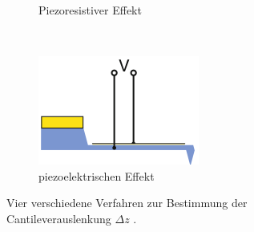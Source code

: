 \begin{figure}[H]
\begin{subfigure}[t]{0.22\textwidth}
  \caption{Piezoresistiver Effekt}
  \label{fig:typ3}
  \end{subfigure}
  ~
  \begin{subfigure}[t]{0.22\textwidth}
  \includegraphics[width=\textwidth]{Abb/typ4.png}
  \caption{piezoelektrischen Effekt}
  \label{fig:typ4}
  \end{subfigure}
	\caption{Vier verschiedene Verfahren zur Bestimmung der Cantileverauslenkung
  $\Delta z$ \cite{AFM}.}
\label{fig:typen}
\end{figure}

